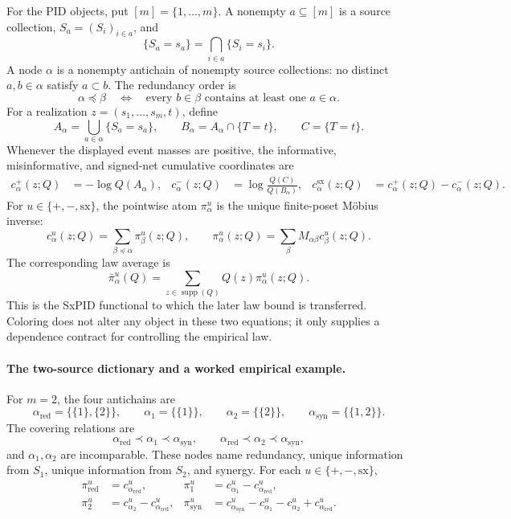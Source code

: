 \documentclass[11pt]{article}
\theoremstyle{definition}
\newcommand{\supp}{\operatorname{supp}}
\newcommand{\sx}{\mathrm{sx}}
\begin{document}
For the PID objects, put $[m]=\{1,\ldots,m\}$.  A nonempty $a\subseteq[m]$ is a source collection,
$S_a=(S_i)_{i\in a}$, and
\[
  \{S_a=s_a\}=\bigcap_{i\in a}\{S_i=s_i\}.
\]
A node $\alpha$ is a nonempty antichain of nonempty source collections: no distinct
$a,b\in\alpha$ satisfy $a\subset b$.  The redundancy order is
\[
  \alpha\preceq\beta
  \quad\Longleftrightarrow\quad
  \text{every }b\in\beta\text{ contains at least one }a\in\alpha.
\]
For a realization $z=(s_1,\ldots,s_m,t)$, define
\[
  A_\alpha=\bigcup_{a\in\alpha}\{S_a=s_a\},
  \qquad
  B_\alpha=A_\alpha\cap\{T=t\},
  \qquad
  C=\{T=t\}.
\]
Whenever the displayed event masses are positive, the informative, misinformative, and signed-net
cumulative coordinates are
\begin{align}
  c^+_\alpha(z;Q)&=-\log Q(A_\alpha),&
  c^-_\alpha(z;Q)&=\log\frac{Q(C)}{Q(B_\alpha)},&
  c^\sx_\alpha(z;Q)&=c^+_\alpha(z;Q)-c^-_\alpha(z;Q).
\end{align}
For $u\in\{+,-,\sx\}$, the pointwise atom $\pi^u_\alpha$ is the unique finite-poset M{\"o}bius
inverse:
\begin{equation}\label{eq:zeta-primer-dependency}
  c^u_\alpha(z;Q)
  =\sum_{\beta\preceq\alpha}\pi^u_\beta(z;Q),
  \qquad
  \pi^u_\alpha(z;Q)
  =\sum_\beta M_{\alpha\beta}c^u_\beta(z;Q).
\end{equation}
The corresponding law average is
\begin{equation}\label{eq:average-primer-dependency}
  \bar\pi^u_\alpha(Q)
  =\sum_{z\in\supp(Q)}Q(z)\pi^u_\alpha(z;Q).
\end{equation}
This is the SxPID functional to which the later law bound is transferred.  Coloring does not alter
any object in these two equations; it only supplies a dependence contract for controlling the
empirical law.

\paragraph{The two-source dictionary and a worked empirical example.}
For $m=2$, the four antichains are
\[
  \alpha_{\mathrm{red}}=\{\{1\},\{2\}\},\qquad
  \alpha_1=\{\{1\}\},\qquad
  \alpha_2=\{\{2\}\},\qquad
  \alpha_{\mathrm{syn}}=\{\{1,2\}\}.
\]
The covering relations are
\[
  \alpha_{\mathrm{red}}\prec\alpha_1\prec\alpha_{\mathrm{syn}},
  \qquad
  \alpha_{\mathrm{red}}\prec\alpha_2\prec\alpha_{\mathrm{syn}},
\]
and $\alpha_1,\alpha_2$ are incomparable.  These nodes name redundancy, unique information from
$S_1$, unique information from $S_2$, and synergy.  For each $u\in\{+,-,\sx\}$,
\begin{align}
  \pi_{\mathrm{red}}^u
    &=c_{\alpha_{\mathrm{red}}}^u,&
  \pi_1^u
    &=c_{\alpha_1}^u-c_{\alpha_{\mathrm{red}}}^u,\\
  \pi_2^u
    &=c_{\alpha_2}^u-c_{\alpha_{\mathrm{red}}}^u,&
  \pi_{\mathrm{syn}}^u
    &=c_{\alpha_{\mathrm{syn}}}^u-c_{\alpha_1}^u-c_{\alpha_2}^u
      +c_{\alpha_{\mathrm{red}}}^u.
\end{align}
\end{document}
